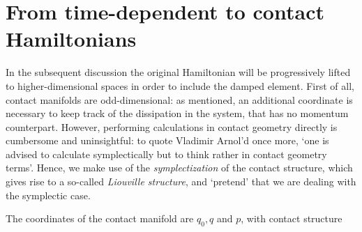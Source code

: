 %
%

\section{From time-dependent to contact Hamiltonians}
In the subsequent discussion the original Hamiltonian will be progressively lifted to higher-dimensional spaces in order to include the damped element. First of all, contact manifolds are odd-dimensional: as mentioned, an additional coordinate is necessary to keep track of the dissipation in the system, that has no momentum counterpart. However, performing calculations in contact geometry directly is cumbersome and uninsightful: to quote Vladimir Arnol'd once more, `one is advised to calculate symplectically but to think rather in contact geometry terms'. \cite{Arnold1989a} Hence, we make use of the \emph{symplectization} of the contact structure, which gives rise to a so-called \emph{Liouville structure}, and `pretend' that we are dealing with the symplectic case.

The coordinates of the contact manifold are $q_0, q$ and $p$, with contact structure

